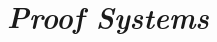 
\part{\emph{Proof Systems}}







\newcommand{\NJ}{\ensuremath{\mathbf{NJ}}\xspace} %
\newcommand{\LK}{\ensuremath{\mathbf{LK}}\xspace} %
\newcommand{\LJ}{\ensuremath{\mathbf{LJ}}\xspace} %
\newcommand{\LJmc}{\ensuremath{\mathbf{LJ'}}\xspace} %
\newcommand{\SystemF}{\ensuremath{\mathbf{F}}\xspace} %
\newcommand{\Bledsoe}{\ensuremath{\mathbf{Prover}}\xspace} %
\newcommand{\Muscadet}{\ensuremath{\mathbf{Muscadet}}\xspace} %
\renewcommand{\LL}{\ensuremath{\mathbf{LL}}\xspace} %
\newcommand{\ILL}{\ensuremath{\mathbf{ILL}}\xspace} %
\newcommand{\LC}{\ensuremath{\mathbf{LC}}\xspace} %
\newcommand{\LF}{\ensuremath{\mathbf{LF}}\xspace} %
\renewcommand{\lambdabar}{\overline{\lambda}} %
\newcommand{\LJT}{\ensuremath{\mathbf{LJT}}\xspace} %
\newcommand{\Gtc}{\ensuremath{\mathbf{G3c}}\xspace} %
\newcommand{\LLP}{\ensuremath{\mathbf{LLP}}\xspace} %
\newcommand{\LKmumutilde}{\ensuremath{\mathbf{LK}_{\mu\tilde\mu}}\xspace} %
\newcommand{\LKT}{\ensuremath{\mathbf{LKT}\xspace}} %
\newcommand{\LKQ}{\ensuremath{\mathbf{LKQ}\xspace}} %
\newcommand{\LKmumutildetree}{\ensuremath{\mathbf{LK}_{\mu\tilde\mu}-\mathbf{tree}}\xspace} %
\newcommand{\calcoloP}{{\bf $\mathcal{T}P^{\bf T}$}} %
\newcommand{\LKF}{\ensuremath{\mathbf{LKF}}\xspace} %
\newcommand{\LJF}{\ensuremath{\mathbf{LJF}}\xspace} %
\newcommand{\FILL}{\ensuremath{\mathbf{FILL}}\xspace} %
\newcommand{\FIL}{\ensuremath{\mathbf{FIL}}\xspace} %
\newcommand{\NDc}{\ensuremath{\mathbf{ND}^\mathbf{c}}\xspace} %
\newcommand{\seqlcnxt}{\ensuremath{\mathrm{SKMlin}}\xspace} %



